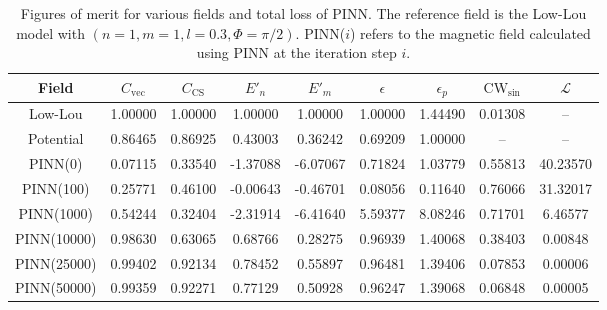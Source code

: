 \begin{table}
  \centering
  \caption{Figures of merit for various fields and total loss of PINN. The reference field is the Low-Lou model with $(n=1, m=1, l=0.3, \Phi=\pi/2)$. PINN($i$) refers to the magnetic field calculated using PINN at the iteration step $i$.}\label{tab:metric}
  \begin{NiceTabular}{ccccccccc}
  \toprule
  Field & $C_\text{vec}$ & $C_\text{CS}$ & $E'_n$ & $E'_m$ & $\epsilon$ & $\epsilon_p$ & $\text{CW}_\text{sin}$ & $\mathcal{L}$ \\ 
  \midrule
  Low-Lou & 1.00000 & 1.00000 & 1.00000 & 1.00000 & 1.00000 & 1.44490 & 0.01308 & -- \\
  Potential & 0.86465 & 0.86925 & 0.43003 & 0.36242 & 0.69209 & 1.00000 & -- & -- \\
  PINN(0) & 0.07115 & 0.33540 & -1.37088 & -6.07067 & 0.71824 & 1.03779 & 0.55813 & 40.23570 \\
  PINN(100) & 0.25771 & 0.46100 & -0.00643 & -0.46701 & 0.08056 & 0.11640 & 0.76066 & 31.32017 \\
  PINN(1000) & 0.54244 & 0.32404 & -2.31914 & -6.41640 & 5.59377 & 8.08246 & 0.71701 & 6.46577 \\
  PINN(10000) & 0.98630 & 0.63065 & 0.68766 & 0.28275 & 0.96939 & 1.40068 & 0.38403 & 0.00848 \\
  PINN(25000) & 0.99402 & 0.92134 & 0.78452 & 0.55897 & 0.96481 & 1.39406 & 0.07853 & 0.00006 \\
  PINN(50000) & 0.99359 & 0.92271 & 0.77129 & 0.50928 & 0.96247 & 1.39068 & 0.06848 & 0.00005 \\
  \bottomrule
  \end{NiceTabular}
\end{table}

